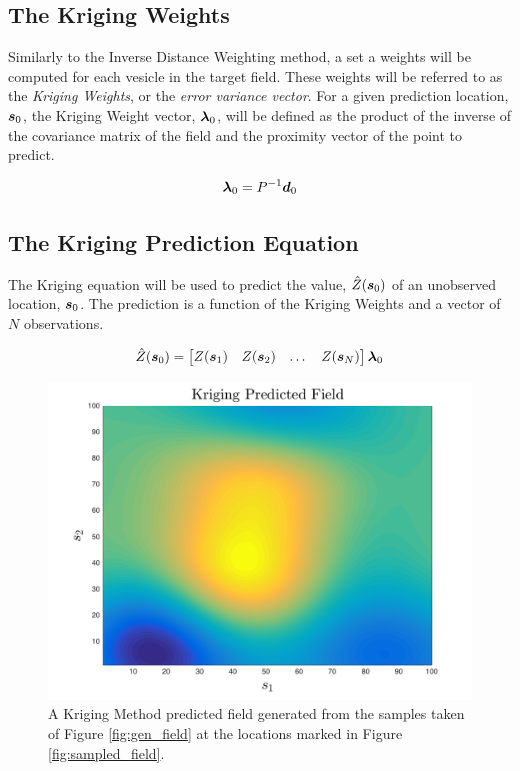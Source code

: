 \documentclass[11pt]{ucthesis}
\newcommand{\vect}[1]{{\it{\boldsymbol{#1}}}}
\begin{document}
\subsection{The Kriging Weights}
Similarly to the Inverse Distance Weighting method, a set a weights will be computed for each vesicle in the target field. These weights will be referred to as the \textit{Kriging Weights}, or the \textit{error variance vector}. For a given prediction location, $\vect{s}_0$, the Kriging Weight vector, $\vect{\lambda}_0$, will be defined as the product of the inverse of the covariance matrix of the field and the proximity vector of the point to predict.

\begin{equation}
    \vect{\lambda}_{0} = P^{-1}\vect{d}_{0}
    \label{eq:krigweights}
\end{equation}

\subsection{The Kriging Prediction Equation}
The Kriging equation will be used to predict the value, $\hat{Z}(\vect{s}_0)$ of an unobserved location, $\vect{s}_0$. The prediction is a function of the Kriging Weights and a vector of $N$ observations. 

\begin{equation}
    \hat{Z}(\vect{s}_0) = \begin{bmatrix} Z(\vect{s}_1) & Z(\vect{s}_2) & \dots & Z(\vect{s}_N) \end{bmatrix}\vect{\lambda}_{0}
    \label{eq:krigeq}
\end{equation}

\begin{figure}[!]
    \centering
    \includegraphics[width=0.8\linewidth]{figures/kriging_prediction.png}
    \caption{A Kriging Method predicted field generated from the samples taken of Figure \ref{fig:gen_field} at the locations marked in Figure \ref{fig:sampled_field}.}
    \label{fig:krig_field}
\end{figure}
\end{document}
